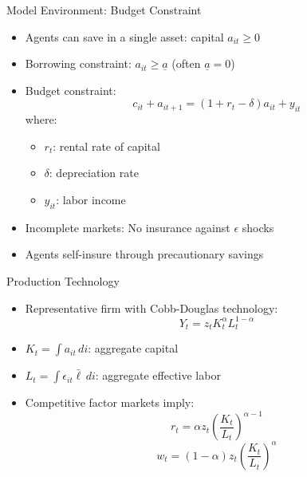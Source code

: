 \documentclass[aspectratio=169]{beamer}
\newcommand{\1}{\mathbf{1}}
\begin{document}
\begin{frame}{Model Environment: Budget Constraint}
  \begin{itemize}
      \item Agents can save in a single asset: capital $a_{it} \geq 0$
      \item Borrowing constraint: $a_{it} \geq \underline{a}$ (often $\underline{a} = 0$)
      \item Budget constraint:
      \[
      c_{it} + a_{it+1} = (1 + r_t - \delta) a_{it} + y_{it}
      \]
      where:
      \begin{itemize}
          \item $r_t$: rental rate of capital
          \item $\delta$: depreciation rate
          \item $y_{it}$: labor income
      \end{itemize}
      \item Incomplete markets: No insurance against $\epsilon$ shocks
      \item Agents self-insure through precautionary savings
  \end{itemize}
\end{frame}

\begin{frame}{Production Technology}
  \begin{itemize}
      \item Representative firm with Cobb-Douglas technology:
      \[
      Y_t = z_t K_t^\alpha L_t^{1-\alpha}
      \]
      \item $K_t = \int a_{it} \, di$: aggregate capital
      \item $L_t = \int \epsilon_{it} \bar{\ell} \, di$: aggregate effective labor
      \item Competitive factor markets imply:
      \[
      r_t = \alpha z_t \left(\frac{K_t}{L_t}\right)^{\alpha-1}
      \]
      \[
      w_t = (1-\alpha) z_t \left(\frac{K_t}{L_t}\right)^{\alpha}
      \]
  \end{itemize}
\end{frame}

\end{document}

